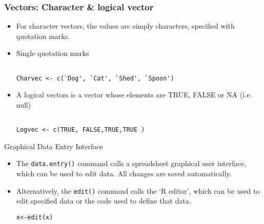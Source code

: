 \documentclass{beamer}
\begin{document}
\begin{frame}[fragile]
\frametitle{Vectors: Character \& logical vector}

\begin{itemize}
\item For character vectors, the values are simply characters,
specified with quotation marks.
\item Single quotation marks
\begin{framed}
\begin{verbatim}

Charvec <- c(`Dog', `Cat', `Shed', `Spoon')

\end{verbatim}
\end{framed}

\item A logical vectors is a vector whose elements are TRUE, FALSE
or NA (i.e. null)

\begin{framed}
\begin{verbatim}

Logvec <- c(TRUE, FALSE,TRUE,TRUE )

\end{verbatim}
\end{framed}

\end{itemize}
\end{frame}
\begin{frame}[fragile]{Graphical Data Entry Interface}
\begin{itemize}

\item The \texttt{data.entry()} command calls a spreadsheet graphical user
interface, which can be used to edit data. All changes are saved
automatically.




\item Alternatively, the \texttt{edit()} command calls the `R editor',
which can be used to edit specified data or the code used to
define that data.

\begin{verbatim}
x<-edit(x)
\end{verbatim}

\end{itemize}
\end{frame}
\end{document}
